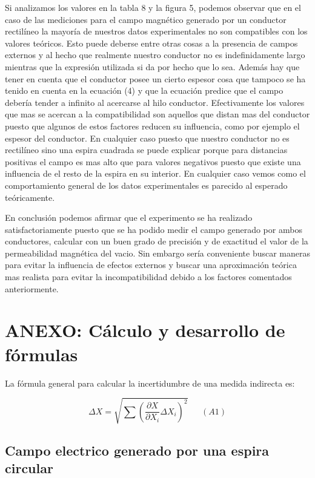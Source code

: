 \documentclass[article, 11pt]{report}
\newcommand{\dpartial}[2]{\frac{\partial #1 }{\partial #2}}
\begin{document}
 Si analizamos los valores en la tabla 8 y la figura 5, podemos observar que en el caso de las mediciones para el campo magnético generado por un conductor rectilíneo la mayoría de nuestros datos experimentales no son compatibles con los valores teóricos. Esto puede deberse entre otras cosas a la presencia de campos externos y al hecho que realmente nuestro conductor no es indefinidamente largo mientras que la expresión utilizada si da por hecho que lo sea. Además hay que tener en cuenta que el conductor posee un cierto espesor cosa que tampoco se ha tenido en cuenta en la ecuación (4) y que la ecuación predice que el campo debería tender a infinito al acercarse al hilo conductor. Efectivamente los valores que mas se acercan a la compatibilidad son aquellos que distan mas del conductor puesto que algunos de estos factores reducen su influencia, como por ejemplo el espesor del conductor. En cualquier caso puesto que nuestro conductor no es rectilíneo sino una espira cuadrada se puede explicar porque para distancias positivas el campo es mas alto que para valores negativos puesto que existe una influencia de el resto de la espira en su interior. En cualquier caso vemos como el comportamiento general de los datos experimentales es parecido al esperado teóricamente. 
 
 
 
 
 En conclusión podemos afirmar que el experimento se ha realizado satisfactoriamente puesto que se ha podido medir el campo generado por ambos conductores, calcular con un buen grado de precisión y de exactitud el valor de la permeabilidad magnética del vacio. Sin embargo sería conveniente buscar maneras para evitar la influencia de efectos externos y buscar una aproximación teórica mas realista para evitar la incompatibilidad debido a los factores comentados anteriormente. 
 
 
 
 
 

\section{ ANEXO: Cálculo  y desarrollo de fórmulas}


La fórmula general para calcular la incertidumbre de una medida indirecta es:


$$	\Delta X = \sqrt{\sum{(\dpartial{X}{X_i} \Delta X_i)^2}}  ~~~~~~~(A1)$$



\subsection*{Campo electrico generado por una espira circular}
\end{document}
